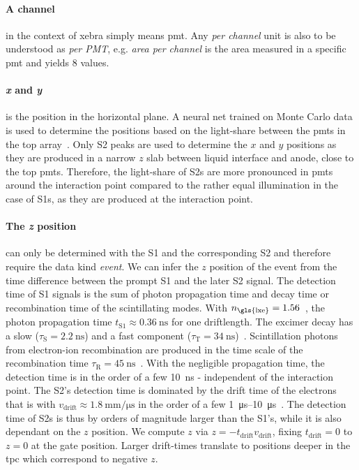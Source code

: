 \paragraph{A channel} in the context of \gls{xebra} simply means \gls{pmt}.
Any \emph{per channel} unit is also to be understood as \emph{per PMT}, e.g. \emph{area per channel} is the area measured in a specific \gls{pmt} and yields 8 values.

\paragraph{\emph{x} and \emph{y}} is the position in the horizontal plane.
A neural net trained on Monte Carlo data is used to determine the positions based on the light-share between the \glspl{pmt} in the top array~\cite{ABism}.
Only S2 peaks are used to determine the $ x $ and $ y $ positions as they are produced in a narrow $ z $ slab between liquid interface and anode, close to the top \glspl{pmt}.
Therefore, the light-share of S2s are more pronounced in \glspl{pmt} around the interaction point compared to the rather equal illumination in the case of S1s, as they are produced at the interaction point.


\paragraph{The \emph{z} position} can only be determined with the S1 and the corresponding S2 and therefore require the data kind \emph{event}.
We can infer the $ z $ position of the event from the time difference between the prompt S1 and the later S2 signal.
The detection time of S1 signals is the sum of photon propagation time and decay time or recombination time of the scintillating modes.
With $ n_\mathrm{\gls{lxe}} = 1.56 $~\cite{Solovov04}, the photon propagation time $ t_\mathrm{S1} \approx \SI{0.36}{\nano\second} $ for one driftlength.
The excimer decay has a slow ($ \tau_\mathrm{S} = \SI{2.2}{\nano\second} $) and a fast component ($ \tau_\mathrm{T} = \SI{34}{\nano\second} $)~\cite{Kubota78}.
Scintillation photons from electron-ion recombination are produced in the time scale of the recombination time $ \tau_\mathrm{R} = \SI{45}{\nano\second} $~\cite{Hitachi83}.
With the negligible propagation time, the detection time is in the order of a few \SI{10}{\nano\second} - independent of the interaction point.
The S2's detection time is dominated by the drift time of the electrons that is with $ v_\mathrm{drift} \approx \SI{1.8}{\milli\meter\per\micro\second} $ in the order of a few \SIrange{1}{10}{\micro\second}~\cite{Aalbers18}.
The detection time of S2s is thus by orders of magnitude larger than the S1's, while it is also dependant on the $ z $ position.
We compute $ z $ via $ z = - t_\mathrm{drift} v_\mathrm{drift} $, fixing $ t_\mathrm{drift} = 0 $ to $ z = 0 $ at the gate position.
Larger drift-times translate to positions deeper in the \gls{tpc} which correspond to negative $ z $.


